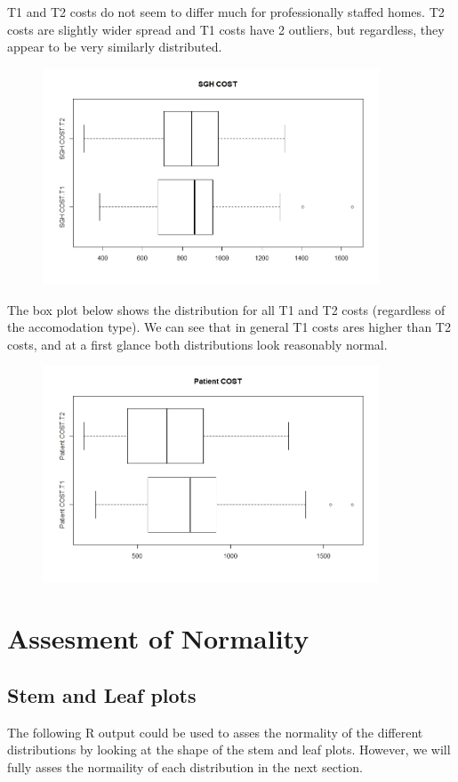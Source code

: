 \documentclass[]{article}
\begin{document}
T1 and T2 costs do not seem to differ much for professionally staffed homes. T2 costs are slightly wider spread and T1 costs have 2 outliers, but regardless, they appear to be very similarly distributed.
\begin{figure}[H]
\centering
\includegraphics[width=10cm]{RStudio/jpeg/Box_SGH.jpeg}
\end{figure}
\newpage
The box plot below shows the distribution for all T1 and T2 costs (regardless of the accomodation type). We can see that in general T1 costs ares higher than T2 costs, and at a first glance both distributions look reasonably normal.
\begin{figure}[H]
\centering
\includegraphics[width=10cm]{RStudio/jpeg/Box_COST.jpeg}
\end{figure}

\section{Assesment of Normality}
\subsection{Stem and Leaf plots}
The following R output could be used to asses the normality of the different distributions by looking at the shape of the stem and leaf plots. However, we will fully asses the normaility of each distribution in the next section.
\end{document}
